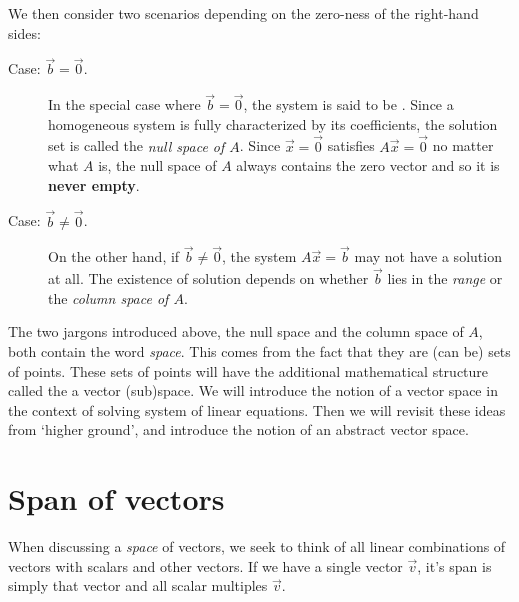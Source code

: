 \documentclass{ximera}
\begin{document}
We then consider two scenarios depending on the zero-ness of the right-hand
sides:
\begin{description}
  \item[Case: $\vec{b} = \vec{0}$.] In the special case where $\vec{b} =
      \vec{0}$,
    the system is said to be . Since a homogeneous system is
    fully characterized by its coefficients, the solution set is called the
    \textit{null space of $A$}. Since $\vec{x} = \vec{0}$ satisfies $A\vec{x} =
      \vec{0}$ no matter what $A$ is, the null space of $A$ always contains the
    zero
    vector and so it is \textbf{never empty}.
  \item[Case: $\vec{b} \neq \vec{0}$.] On the other hand, if $\vec{b} \neq
      \vec{0}$, the system $A\vec{x} = \vec{b}$ may not have a solution at all.
    The
    existence of solution depends on whether $\vec{b}$ lies in the
    \textit{range}
    or the \textit{column space of $A$}.
\end{description}

The two jargons introduced above, the null space and the column space of $A$,
both contain the word \textit{space}. This comes from the fact that they are
(can be) sets of points. These sets of points will have the additional
mathematical structure called the a vector (sub)space. We will introduce the
notion of a vector space in the context of solving system of linear equations.
Then we will revisit these ideas from `higher ground', and introduce the notion
of an abstract vector space.

\section{Span of vectors}

When discussing a \textit{space} of vectors, we seek to think of all linear
combinations of vectors with scalars and other vectors. If we have a single
vector $\vec{v}$, it's span is simply that vector and all scalar multiples
$\vec{v}$.
\end{document}
